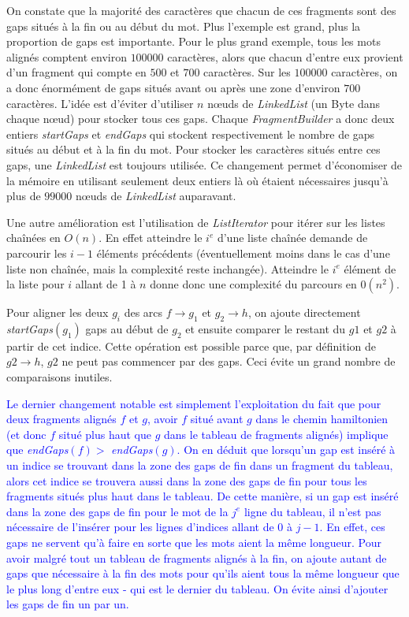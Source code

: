 \documentclass{article}
\begin{document}
On constate que la majorité des caractères que chacun de ces fragments sont des gaps situés à la fin ou au début du mot. Plus l'exemple est grand, plus la proportion de gaps est importante. Pour le plus grand exemple, tous les mots alignés comptent environ $100000$ caractères, alors que chacun d'entre eux provient d'un fragment qui compte en $500$ et $700$ caractères. Sur les $100000$ caractères, on a donc énormément de gaps situés avant ou après une zone d'environ $700$ caractères. L'idée est d'éviter d'utiliser $n$ nœuds de \textit{LinkedList} (un Byte dans chaque nœud) pour stocker tous ces gaps.
Chaque \textit{FragmentBuilder} a donc deux entiers \textit{startGaps} et \textit{endGaps} qui stockent respectivement le nombre de gaps situés au début et à la fin du mot. Pour stocker les caractères situés entre ces gaps, une \textit{LinkedList} est toujours utilisée. Ce changement permet d'économiser de la mémoire en utilisant seulement deux entiers là où étaient nécessaires jusqu'à plus de $99000$ nœuds de \textit{LinkedList} auparavant. 

Une autre amélioration est l'utilisation de \textit{ListIterator} pour itérer sur les listes chaînées en $O(n)$. En effet atteindre le $i^e$ d'une liste chaînée demande de parcourir les $i-1$ éléments précédents (éventuellement moins dans le cas d'une liste non chaînée, mais la complexité reste inchangée). Atteindre le $i^e$ élément de la liste pour $i$ allant de 1 à $n$ donne donc une complexité du parcours en $0(n^2)$.

Pour aligner les deux $g_i$ des arcs $f \to g_1$ et $g_2 \to h$, on ajoute directement \textit{startGaps}$(g_1)$ gaps au début de $g_2$ et ensuite comparer le restant du $g1$ et $g2$ à partir de cet indice. Cette opération est possible parce que, par définition de $g2 \to h$, $g2$ ne peut pas commencer par des gaps. Ceci évite un grand nombre de comparaisons inutiles.

\textcolor{blue}{
Le dernier changement notable est simplement l'exploitation du fait que pour deux fragments alignés $f$ et $g$, avoir $f$ situé avant $g$ dans le chemin hamiltonien (et donc $f$ situé plus haut que $g$ dans le tableau de fragments alignés) implique que \textit{endGaps}$(f) > $  \textit{endGaps}$(g)$. On en déduit que lorsqu'un gap est inséré à un indice se trouvant dans la zone des gaps de fin dans un fragment du tableau, alors cet indice se trouvera aussi dans la zone des gaps de fin pour tous les fragments situés plus haut dans le tableau. De cette manière, si un gap est inséré dans la zone des gaps de fin pour le mot de la $j^e$ ligne du tableau, il n'est pas nécessaire de l'insérer pour les lignes d'indices allant de 0 à $j-1$. En effet, ces gaps ne servent qu'à faire en sorte que les mots aient la même longueur. Pour avoir malgré tout un tableau de fragments alignés à la fin, on ajoute autant de gaps que nécessaire à la fin des mots pour qu'ils aient tous la même longueur que le plus long d'entre eux -  qui est le dernier du tableau. On évite ainsi d'ajouter les gaps de fin un par un.
}
\end{document}
